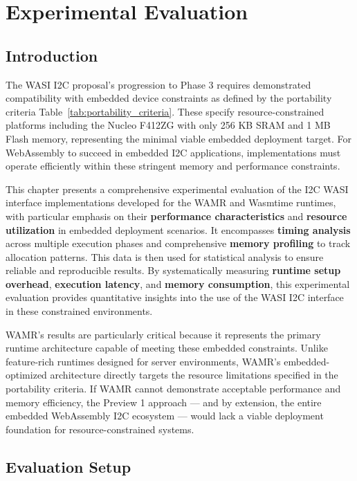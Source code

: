 \chapter{Experimental Evaluation}
\label{chap:eval}

\section{Introduction}
\label{sec:eval-intro}

The WASI I2C proposal's progression to Phase 3 requires demonstrated compatibility with embedded device constraints as defined by the portability criteria Table~\ref{tab:portability_criteria}. These specify resource-constrained platforms including the Nucleo F412ZG with only 256 KB SRAM and 1 MB Flash memory, representing the minimal viable embedded deployment target. For WebAssembly to succeed in embedded I2C applications, implementations must operate efficiently within these stringent memory and performance constraints.

This chapter presents a comprehensive experimental evaluation of the I2C WASI interface implementations developed for the WAMR and Wasmtime runtimes, with particular emphasis on their \textbf{performance characteristics} and \textbf{resource utilization} in embedded deployment scenarios. It encompasses \textbf{timing analysis} across multiple execution phases and comprehensive \textbf{memory profiling} to track allocation patterns. This data is then used for statistical analysis to ensure reliable and reproducible results. By systematically measuring \textbf{runtime setup overhead}, \textbf{execution latency}, and \textbf{memory consumption}, this experimental evaluation provides quantitative insights into the use of the WASI I2C interface in these constrained environments.

WAMR's results are particularly critical because it represents the primary runtime architecture capable of meeting these embedded constraints. Unlike feature-rich runtimes designed for server environments, WAMR's embedded-optimized architecture directly targets the resource limitations specified in the portability criteria. If WAMR cannot demonstrate acceptable performance and memory efficiency, the Preview 1 approach --- and by extension, the entire embedded WebAssembly I2C ecosystem --- would lack a viable deployment foundation for resource-constrained systems.\\

\section{Evaluation Setup}
\label{sec:eval-methodology}

